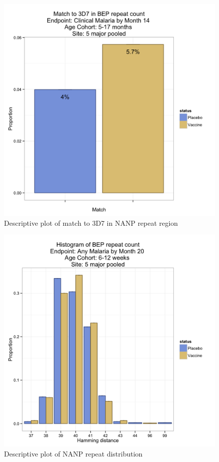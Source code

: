 \documentclass[]{article}
\begin{document}
\begin{figure}[htbp]
\centering
\includegraphics{figures/bep-match-infact-c-1.png}
\caption{Descriptive plot of match to 3D7 in NANP repeat region}
\end{figure}

\begin{figure}[htbp]
\centering
\includegraphics{figures/bep-hist-newborn-c-1.png}
\caption{Descriptive plot of NANP repeat distribution}
\end{figure}
\end{document}
